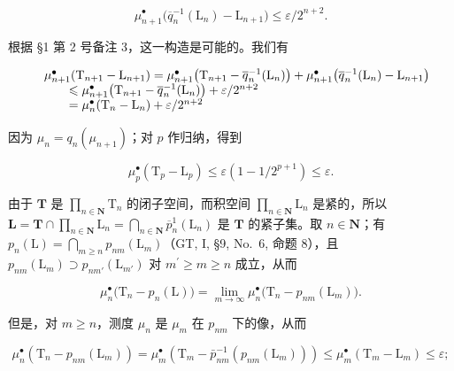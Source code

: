 \[
\mu_ {n + 1} ^ {\bullet} \big (\overline{q}_{n}^{-1} (\mathrm{L} _ {n}) - \mathrm{L} _ {n + 1} \big) \leqslant \varepsilon / 2 ^ {n + 2}.
\]

根据 §1 第 2 号备注 3，这一构造是可能的。我们有

\[
\begin{array}{r l} & {\mu_ {n + 1} ^ {\bullet} (\mathrm{T} _ {n + 1} - \mathrm{L} _ {n + 1}) = \mu_ {n + 1} ^ {\bullet} \big (\mathrm{T} _ {n + 1} - \overline{q}_{n}^{-1} (\mathrm{L} _ {n}) \big) + \mu_ {n + 1} ^ {\bullet} \big (\overline{q}_{n}^{-1} (\mathrm{L} _ {n}) - \mathrm{L} _ {n + 1} \big)} \\ & {\qquad \leqslant \mu_ {n + 1} ^ {\bullet} \big (\mathrm{T} _ {n + 1} - \overline{q}_{n}^{-1} (\mathrm{L} _ {n}) \big) + \varepsilon / 2 ^ {n + 2}} \\ & {\qquad = \mu_ {n} ^ {\bullet} (\mathrm{T} _ {n} - \mathrm{L} _ {n}) + \varepsilon / 2 ^ {n + 2}} \end{array}
\]

因为 \(\mu_{n} = q_{n}(\mu_{n + 1})\)；对 \(p\) 作归纳，得到

\[
\mu_ {p} ^ {\bullet} \left(\mathrm{T} _ {p} - \mathrm{L} _ {p}\right) \leqslant \varepsilon \left(1 - 1 / 2 ^ {p + 1}\right) \leqslant \varepsilon .
\]

由于 \(\mathbf{T}\) 是 \(\prod_{n\in \mathbf{N}}\mathrm{T}_n\) 的闭子空间，而积空间 \(\prod_{n\in \mathbf{N}}\mathrm{L}_n\) 是紧的，所以 \(\mathbf{L} = \mathbf{T}\cap \prod_{n\in \mathbf{N}}\mathrm{L}_n = \bigcap_{n\in \mathbf{N}}\overline{p}_n^1 (\mathrm{L}_n)\) 是 \(\mathbf{T}\) 的紧子集。取 \(n\in \mathbf{N}\)；有 \(p_n(\mathrm{L}) = \bigcap_{m\geqslant n}p_{nm}(\mathrm{L}_m)\)（GT, I, §9, No.~6, 命题 8），且 \(p_{nm}(\mathrm{L}_m)\supset p_{nm'}(\mathrm{L}_{m'})\) 对 \(m^{\prime}\geqslant m\geqslant n\) 成立，从而

\[
\mu_ {n} ^ {\bullet} \big (\mathrm{T} _ {n} - p _ {n} (\mathrm{L}) \big) = \lim _ {m \rightarrow \infty} \mu_ {n} ^ {\bullet} \big (\mathrm{T} _ {n} - p _ {n m} (\mathrm{L} _ {m}) \big).
\]

但是，对 \(m \geqslant n\)，测度 \(\mu_{n}\) 是 \(\mu_{m}\) 在 \(p_{nm}\) 下的像，从而

\[
\mu_ {n} ^ {\bullet} \left(\mathrm{T} _ {n} - p _ {n m} (\mathrm{L} _ {m})\right) = \mu_ {m} ^ {\bullet} \left(\mathrm{T} _ {m} - \bar {p} _ {n m} ^ {- 1} (p _ {n m} (\mathrm{L} _ {m}))\right) \leqslant \mu_ {m} ^ {\bullet} \left(\mathrm{T} _ {m} - \mathrm{L} _ {m}\right) \leqslant \varepsilon ;
\]

